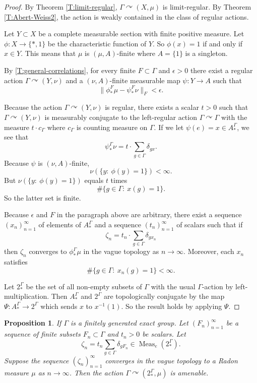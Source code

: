 \documentclass[12pt]{article}
\theoremstyle{plain}
\newtheorem{prop}[thm]{Proposition}
\theoremstyle{definition}
\theoremstyle{remark}
\newcommand{\G}{\Gamma}
\newcommand{\eps}{\epsilon}
\renewcommand\d{\delta}
\newcommand\Meas{{\operatorname{Meas}}}
\def\cc{{\curvearrowright}}
\begin{document}
\begin{proof}
 By Theorem \ref{T:limit-regular}, $\G \cc (X,\mu)$ is limit-regular. By Theorem \ref{T:Abert-Weiss2}, the action is weakly contained in the class of regular actions. 

Let $Y \subset X$ be a complete measurable section with finite positive measure. Let $\phi:X \to \{*,1\}$ be the characteristic function of $Y$. So $\phi(x)=1$ if and only if $x\in Y$. This means that $\mu$ is $(\mu,A)$-finite where $A=\{1\}$ is a singleton. 


By \ref{T:general-correlations}, for every finite $F\subset \G$ and $\eps>0$ there exist a regular action $\G \cc (Y,\nu)$ and a $(\nu,A)$-finite measurable map $\psi:Y \to A$ such that 
$$\|\phi_*^F\mu - \psi^F_*\nu\|_F < \eps.$$

Because the action $\G \cc (Y,\nu)$ is regular, there exists a scalar $t>0$ such that $\G \cc (Y,\nu)$ is measurably conjugate to the left-regular action $\G \cc \G$ with the measure $t\cdot c_\G$ where $c_\G$ is counting measure on $\G$. If we let $\psi(e)=x \in A_*^\G$, we see that 
$$\psi^\G_*\nu=t\cdot \sum_{g\in \G} \d_{gx}.$$
Because $\psi$ is $(\nu,A)$-finite, 
$$\nu(\{y:~ \phi(y)=1\})<\infty.$$
But $\nu(\{y:~ \phi(y)=1\})$ equals $t$ times 
$$\#\{g\in \G:~x(g)=1\}.$$
So the latter set is finite.

Because $\eps$ and $F$ in the paragraph above are arbitrary, there exist a sequence $(x_n)_{n=1}^\infty$ of elements of $A_*^\G$ and a sequence $(t_n)_{n=1}^\infty$ of scalars such that if 
$$\zeta_n = t_n \cdot \sum_{g\in \G} \d_{gx_n}$$
then $\zeta_n$ converges to $\phi^\G_*\mu$ in the vague topology as $n\to\infty$. Moreover, each $x_n$ satisfies
$$\#\{g\in \G:~x_n(g)=1\}<\infty.$$

Let $2^\G_*$ be the set of all non-empty subsets of $\G$ with the usual $\G$-action by left-multiplication. Then $A_*^\G$ and $2^\G$ are topologically conjugate by the map $\Psi:A_*^\G \to 2^\G$ which sends $x$ to $x^{-1}(1)$. So the result holds by applying $\Psi$.
\end{proof}


\begin{prop}\label{P:exact-fg}
If $\G$ is a finitely generated exact group. Let $(F_n)_{n=1}^\infty$ be a sequence of finite subsets $F_n \subset \G$ and $t_n>0$ be scalars. Let 
$$\zeta_n = t_n \sum_{g\in \G} \d_{gF_n} \in \Meas_e(2^\G_*).$$
Suppose the sequence $(\zeta_n)_{n=1}^\infty$ converges in the vague topology to a Radon measure $\mu$ as $n\to\infty$. Then the action $\G \cc (2^\G_*,\mu)$ is amenable.
\end{prop}
\end{document}
